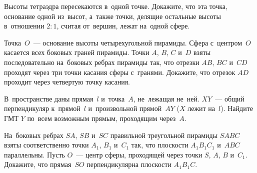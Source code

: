 \begin{problems}
\item
Высоты тетраэдра пересекаются в~одной точке.
Докажите, что эта точка, основание одной из~высот, а~также точки, делящие
остальные высоты в~отношении $2 : 1$, считая от~вершин, лежат на~одной сфере.



\item
Точка~$O$~--- основание высоты четырехугольной пирамиды.
Сфера с~центром~$O$ касается всех боковых граней пирамиды.
Точки $A$, $B$, $C$ и~$D$ взяты последовательно на~боковых ребрах пирамиды так,
что отрезки $AB$, $BC$ и~$CD$ проходят через три точки касания сферы с~гранями.
Докажите, что отрезок $AD$ проходит через четвертую точку касания.

\item
В~пространстве даны прямая~$l$ и~точка~$A$, не~лежащая не~ней.
$XY$~--- общий перпендикуляр к~прямой~$l$ и~произвольной прямой~$AY$
($X$ лежит на~$l$).
Найдите ГМТ $Y$ по~всем возможным прямым, проходящим через~$A$.

\item
На~боковых ребрах $SA$, $SB$ и~$SC$ правильной треугольной пирамиды $SABC$
взяты соответственно точки $A_1$, $B_1$ и~$C_1$ так, что плоскости
$A_1 B_1 C_1$ и~$ABC$ параллельны.
Пусть $O$~--- центр сферы, проходящей через точки $S$, $A$, $B$ и~$C_1$.
Докажите, что прямая~$SO$ перпендикулярна плоскости $A_1 B_1 C$.

\end{problems}

